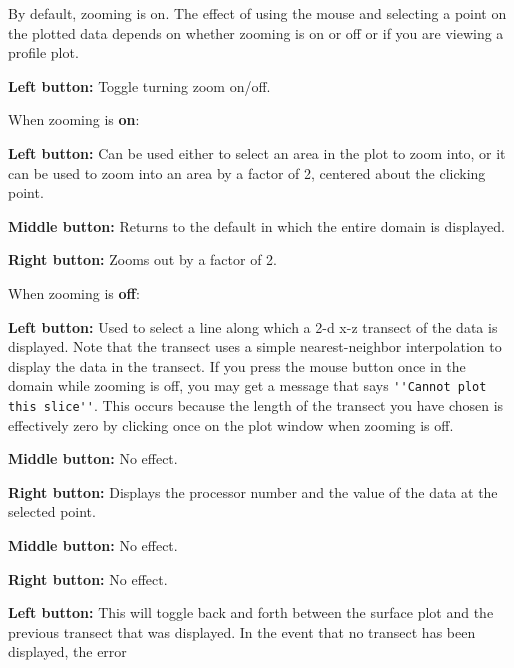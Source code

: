 By default, zooming is on.  The effect of using the mouse and selecting a point on the
plotted data depends on whether zooming is on or off or if you are viewing a profile plot.
\begin{list}{}
\item {}
\begin{list}{}
\item {\bf Left button:} Toggle turning zoom on/off.  
\begin{list}{}
\item When zooming is {\bf on}:
\begin{list}{}
\item {\bf Left button:}  Can be used either to select an area in the plot to zoom into, or
it can be used to zoom into an area by a factor of 2, centered about the clicking point.
\item {\bf Middle button:} Returns to the default in which the entire domain is displayed.
\item {\bf Right button:} Zooms out by a factor of 2.
\end{list}
\item When zooming is {\bf off}:
\begin{list}{}
\item {\bf Left button:}  Used to select a line along which a 2-d x-z transect of the data
is displayed.  Note that the transect uses a simple nearest-neighbor interpolation to
display the data in the transect.  If you press the mouse button once in the domain
while zooming is off, you may get a message that says \verb+''Cannot plot this slice''+.
This occurs because the length of the transect you have chosen is effectively zero by
clicking once on the plot window when zooming is off.
\item {\bf Middle button:} No effect.
\item {\bf Right button:} Displays the processor number and the value of the data at the selected point.
\end{list}
\end{list}
\item {\bf Middle button:} No effect.
\item {\bf Right button:} No effect.
\end{list}
\item {}
\begin{list}{}
\item {\bf Left button:} This will toggle back and forth between the surface plot and the previous
transect that was displayed.  In the event that no transect has been displayed, the error

\end{list}
\end{list}
